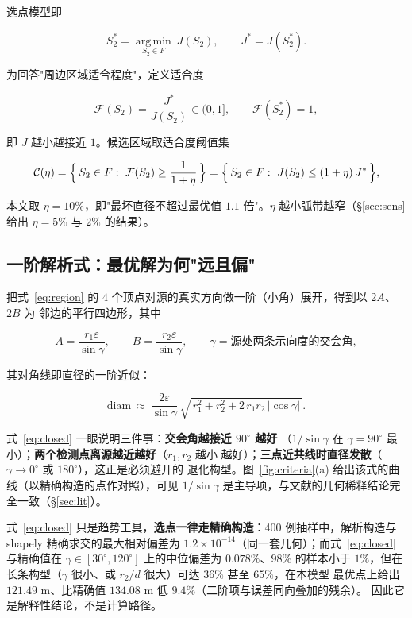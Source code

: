 选点模型即

\begin{equation}
  S_2^*=\operatorname*{arg\,min}_{S_2\in F}\ J(S_2),
  \qquad J^*=J(S_2^*).
  \label{eq:opt}
\end{equation}

为回答"周边区域适合程度"，定义适合度

\begin{equation}
  \mathcal{F}(S_2)=\frac{J^*}{J(S_2)}\in(0,1],\qquad
  \mathcal{F}(S_2^*)=1,
  \label{eq:Fitness}
\end{equation}

即 $J$ 越小越接近 $1$。候选区域取适合度阈值集

\begin{equation}
  \mathcal{C}(\eta)=\Bigl\{\,S_2\in F:\ \mathcal{F}(S_2)\ge\frac{1}{1+\eta}\,\Bigr\}
  =\Bigl\{\,S_2\in F:\ J(S_2)\le(1+\eta)\,J^*\,\Bigr\},
  \label{eq:cand}
\end{equation}

本文取 $\eta=10\%$，即"最坏直径不超过最优值 $1.1$ 倍"。$\eta$ 越小弧带越窄（§\ref{sec:sens}
给出 $\eta=5\%$ 与 $2\%$ 的结果）。

\subsection{一阶解析式：最优解为何"远且偏"}

把式~\eqref{eq:region} 的 $4$ 个顶点对源的真实方向做一阶（小角）展开，得到以 $2A$、$2B$ 为
邻边的平行四边形，其中

\begin{equation}
  A=\frac{r_1\varepsilon}{\sin\gamma},\qquad
  B=\frac{r_2\varepsilon}{\sin\gamma},\qquad
  \gamma=\text{源处两条示向度的交会角},
  \label{eq:AB}
\end{equation}

其对角线即直径的一阶近似：

\begin{equation}
  \mathrm{diam}\ \approx\ \frac{2\varepsilon}{\sin\gamma}\,
  \sqrt{\,r_1^2+r_2^2+2\,r_1r_2\,|\cos\gamma|\,}.
  \label{eq:closed}
\end{equation}

式~\eqref{eq:closed} 一眼说明三件事：\textbf{交会角越接近 $90^\circ$ 越好}
（$1/\sin\gamma$ 在 $\gamma=90^\circ$ 最小）；\textbf{两个检测点离源越近越好}（$r_1,r_2$ 越小
越好）；\textbf{三点近共线时直径发散}（$\gamma\to0^\circ$ 或 $180^\circ$），这正是必须避开的
退化构型。图~\ref{fig:criteria}(a) 给出该式的曲线（以精确构造的点作对照），可见 $1/\sin\gamma$
是主导项，与文献的几何稀释结论完全一致（§\ref{sec:lit}）。

式~\eqref{eq:closed} 只是趋势工具，\textbf{选点一律走精确构造}：400 例抽样中，解析构造与
shapely 精确求交的最大相对偏差为 $1.2\times10^{-14}$（同一套几何）；而式~\eqref{eq:closed}
与精确值在 $\gamma\in[30^\circ,120^\circ]$ 上的中位偏差为 $0.078\%$、$98\%$ 的样本小于
$1\%$，但在长条构型（$\gamma$ 很小、或 $r_2/d$ 很大）可达 $36\%$ 甚至 $65\%$，在本模型
最优点上给出 $121.49$ m、比精确值 $134.08$ m 低 $9.4\%$（二阶项与误差同向叠加的残余）。
因此它是解释性结论，不是计算路径。
